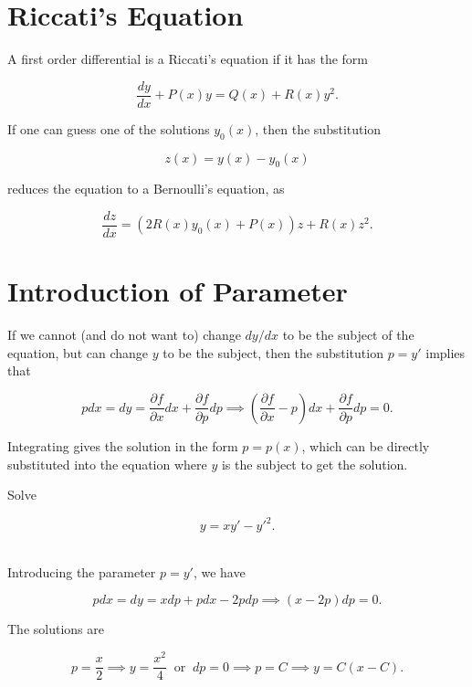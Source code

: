 \documentclass[english,a4paper,12pt]{report}
\begin{document}
\section{Riccati's Equation}

A first order differential is a Riccati's equation if it has the form

\begin{equation}
    \frac{dy}{dx} + P(x)y = Q(x) + R(x)y^2.
\end{equation}

If one can guess one of the solutions \(y_0 (x)\), then the substitution

\begin{equation}
    z(x) = y(x) - y_0(x)
\end{equation}

reduces the equation to a Bernoulli's equation, as

\begin{equation}
    \frac{dz}{dx} = (2R(x)y_0 (x)+P(x))z + R(x)z^2. 
\end{equation}

\section{Introduction of Parameter}

If we cannot (and do not want to) change \( dy /dx\) to be the subject of the equation, but can change \(y\) to be the subject, then the substitution \(p =y'\) implies that 

\begin{equation}
    pdx = dy = \frac{\partial f}{\partial x} dx + \frac{\partial f}{\partial p} dp \implies \left( \frac{\partial f}{\partial x} -p \right)dx + \frac{\partial f}{\partial p} dp = 0.
\end{equation}

Integrating gives the solution in the form \(p = p(x)\), which can be directly substituted into the equation where \(y\) is the subject to get the solution.

{Solve

\begin{equation}
    y = xy'-y'^2.
\end{equation}~
}
{Introducing the parameter \(p = y'\), we have

\begin{equation}
    pdx = dy = xdp + pdx - 2pdp \implies (x-2p)dp = 0.
\end{equation}

The solutions are 

\begin{equation}
    p = \frac{x}{2} \implies y = \frac{x^2}{4} ~\text { or }~ dp = 0 \implies p = C \implies y = C(x-C).  
\end{equation}~
} 
\end{document}
